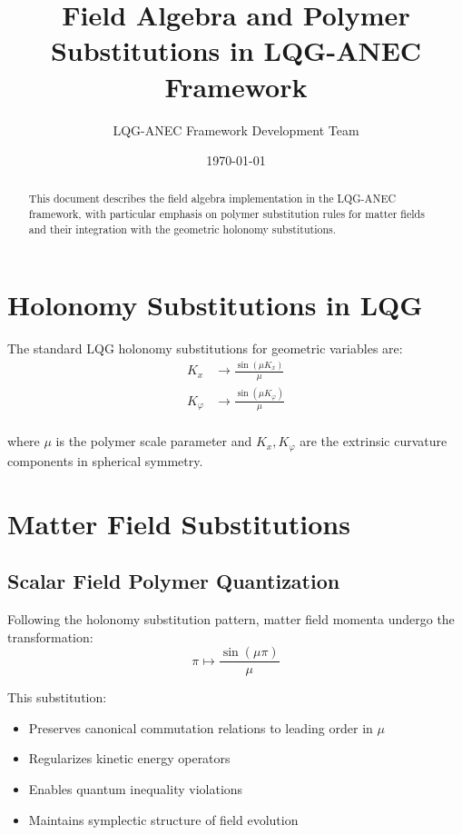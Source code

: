 \documentclass[11pt]{article}
\title{Field Algebra and Polymer Substitutions in LQG-ANEC Framework}
\author{LQG-ANEC Framework Development Team}
\date{\today}
\begin{document}
\maketitle

\begin{abstract}
This document describes the field algebra implementation in the LQG-ANEC framework, with particular emphasis on polymer substitution rules for matter fields and their integration with the geometric holonomy substitutions.
\end{abstract}

\section{Holonomy Substitutions in LQG}

The standard LQG holonomy substitutions for geometric variables are:
\begin{align}
K_x &\rightarrow \frac{\sin(\mu K_x)}{\mu} \\
K_\varphi &\rightarrow \frac{\sin(\mu K_\varphi)}{\mu} \\
\end{align}

where $\mu$ is the polymer scale parameter and $K_x, K_\varphi$ are the extrinsic curvature components in spherical symmetry.

\section{Matter Field Substitutions}

\subsection{Scalar Field Polymer Quantization}

Following the holonomy substitution pattern, matter field momenta undergo the transformation:
\begin{equation}
\pi \mapsto \frac{\sin(\mu \pi)}{\mu}
\end{equation}

This substitution:
\begin{itemize}
\item Preserves canonical commutation relations to leading order in $\mu$
\item Regularizes kinetic energy operators
\item Enables quantum inequality violations
\item Maintains symplectic structure of field evolution
\end{itemize}
\end{document}
